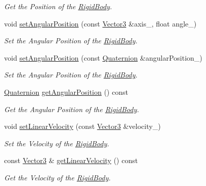 \begin{DoxyCompactItemize}
\begin{DoxyCompactList}\small\item\em Get the Position of the \hyperlink{class_magnum_1_1_physics3_1_1_rigid_body}{Rigid\+Body}. \end{DoxyCompactList}\item 
void \hyperlink{class_magnum_1_1_physics3_1_1_rigid_body_aa35681c3537cd02e1145f51bff78319c}{set\+Angular\+Position} (const \hyperlink{class_magnum_1_1_vector3}{Vector3} \&axis\+\_\+, float angle\+\_\+)
\begin{DoxyCompactList}\small\item\em Set the Angular Position of the \hyperlink{class_magnum_1_1_physics3_1_1_rigid_body}{Rigid\+Body}. \end{DoxyCompactList}\item 
void \hyperlink{class_magnum_1_1_physics3_1_1_rigid_body_ada6e1badf71059ca01b1c20f6a679e5d}{set\+Angular\+Position} (const \hyperlink{class_magnum_1_1_quaternion}{Quaternion} \&angular\+Position\+\_\+)
\begin{DoxyCompactList}\small\item\em Set the Angular Position of the \hyperlink{class_magnum_1_1_physics3_1_1_rigid_body}{Rigid\+Body}. \end{DoxyCompactList}\item 
\hyperlink{class_magnum_1_1_quaternion}{Quaternion} \hyperlink{class_magnum_1_1_physics3_1_1_rigid_body_ae246ed60a6f5118f8f1fbe791a419a11}{get\+Angular\+Position} () const 
\begin{DoxyCompactList}\small\item\em Get the Angular Position of the \hyperlink{class_magnum_1_1_physics3_1_1_rigid_body}{Rigid\+Body}. \end{DoxyCompactList}\item 
void \hyperlink{class_magnum_1_1_physics3_1_1_rigid_body_a2bdd8f784c9c3b65213478e58f7248e1}{set\+Linear\+Velocity} (const \hyperlink{class_magnum_1_1_vector3}{Vector3} \&velocity\+\_\+)
\begin{DoxyCompactList}\small\item\em Set the Velocity of the \hyperlink{class_magnum_1_1_physics3_1_1_rigid_body}{Rigid\+Body}. \end{DoxyCompactList}\item 
const \hyperlink{class_magnum_1_1_vector3}{Vector3} \& \hyperlink{class_magnum_1_1_physics3_1_1_rigid_body_a24324dba4ea0c6b8c5fc82a1383db1fb}{get\+Linear\+Velocity} () const 
\begin{DoxyCompactList}\small\item\em Get the Velocity of the \hyperlink{class_magnum_1_1_physics3_1_1_rigid_body}{Rigid\+Body}. \end{DoxyCompactList}\item 

\end{DoxyCompactItemize}
